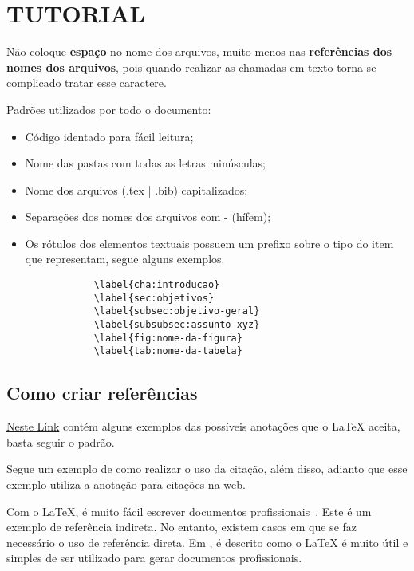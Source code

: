 \section{\textbf{TUTORIAL}}
    \label{cha:tutorial}
\hypersetup{colorlinks=true, linkcolor=black, urlcolor=black}
    Não coloque \textbf{espaço} no nome dos arquivos, muito menos nas \textbf{referências dos nomes dos arquivos}, pois quando realizar as chamadas em texto torna\hyp{se} complicado tratar esse caractere.
    
    Padrões utilizados por todo o documento:
    \begin{itemize}
        \item Código identado para fácil leitura;
        \item Nome das pastas com todas as letras minúsculas;
        \item Nome dos arquivos (.tex | .bib) capitalizados;
        \item Separações dos nomes dos arquivos com - (hífem);
        \item Os rótulos dos elementos textuais possuem um prefixo sobre o tipo do item que representam, segue alguns exemplos.
        \begin{verbatim} 
            \label{cha:introducao}
            \label{sec:objetivos}
            \label{subsec:objetivo-geral}
            \label{subsubsec:assunto-xyz}
            \label{fig:nome-da-figura}
            \label{tab:nome-da-tabela}
        \end{verbatim} 
    \end{itemize}

\subsection{\textbf{Como criar referências}}
\label{sec:referencias}

\href{https://verbosus.com/bibtex-style-examples.html}{Neste Link} contém alguns exemplos das possíveis anotações que o \LaTeX{} aceita, basta seguir o padrão.

Segue um exemplo de como realizar o uso da citação, além disso, adianto que esse exemplo utiliza a anotação para citações na web.

Com o \LaTeX{}, é muito fácil escrever documentos profissionais~\cite{latex1995}. Este é um exemplo de referência indireta. No entanto, existem casos em que se faz necessário o uso de referência direta. Em , é descrito como o \LaTeX{} é muito útil e simples de ser utilizado para gerar documentos profissionais.

